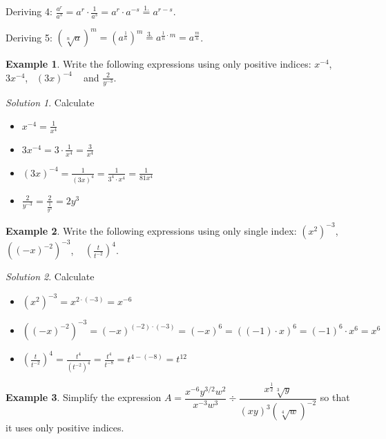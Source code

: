 \documentclass[
  12pt,
  oneside]{book}
\providecommand{\tightlist}{%
  \setlength{\itemsep}{0pt}\setlength{\parskip}{0pt}}
\theoremstyle{definition}
\theoremstyle{definition}
\newtheorem{example}{Example}[chapter]
\theoremstyle{definition}
\theoremstyle{definition}
\theoremstyle{remark}
\newtheorem*{solution}{Solution}
\begin{document}
Deriving 4: \(\frac{a^r}{a^s} = a^r\cdot \frac{1}{a^s} = a^r\cdot a^{-s} \stackrel{1.}{=} a^{r-s}\).

Deriving 5: \(\left(\sqrt[n]{a}\right)^m = \left(a^{\frac{1}{n}}\right)^m \stackrel{3.}{=} a^{\frac{1}{n}\cdot m} = a^\frac{m}{n}\).

\begin{example}
Write the following expressions using only positive indices: \(x^{-4}\),~ \(3x^{-4}\),~ \((3x)^{-4}\) ~ and \(\frac{2}{y^{-3}}\).
\end{example}

\begin{solution}

Calculate

\begin{itemize}
\tightlist
\item
  \(x^{-4}=\frac{1}{x^4}\)
\item
  \(3x^{-4}=3\cdot\frac{1}{x^4}=\frac{3}{x^4}\)
\item
  \((3x)^{-4} = \frac{1}{(3x)^4} = \frac{1}{3^4\cdot x^4}=\frac{1}{81x^4}\)
\item
  \(\frac{2}{y^{-3}}=\frac{2}{\frac{1}{y^3}}=2y^3\)
\end{itemize}

\end{solution}

\begin{example}
Write the following expressions using only single index: \(\left(x^2\right)^{-3}\), ~ \(\left((-x)^{-2}\right)^{-3}\), ~ \(\left(\frac{t}{t^{-2}}\right)^{4}\).
\end{example}

\begin{solution}

Calculate

\begin{itemize}
\tightlist
\item
  \(\left(x^2\right)^{-3} = x^{2\cdot(-3)}=x^{-6}\)
\item
  \(\left((-x)^{-2}\right)^{-3} = (-x)^{(-2)\cdot(-3)}=(-x)^{6}=\left((-1)\cdot x\right)^6=(-1)^6\cdot x^6=x^6\)
\item
  \(\left(\frac{t}{t^{-2}}\right)^{4}=\frac{t^4}{(t^{-2})^4}=\frac{t^4}{t^{-8}}=t^{4-(-8)}=t^{12}\)
\end{itemize}

\end{solution}

\begin{example}
Simplify the expression \(A=\dfrac{x^{-6}y^{3/2}w^2}{x^{-3}w^3}\div\dfrac{x^\frac12\sqrt[3]{y}}{(xy)^3(\sqrt[4]{w})^{-2}}\) so that it uses only positive indices.
\end{example}
\end{document}
